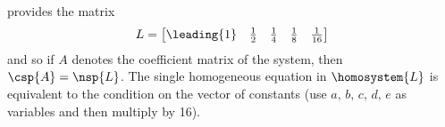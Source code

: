 provides the matrix
%
\begin{equation*}
L=
\begin{bmatrix}
\leading{1} & \frac{1}{2} & \frac{1}{4} & \frac{1}{8} & \frac{1}{16}
\end{bmatrix}
\end{equation*}
%
and so if $A$ denotes the coefficient matrix of the system, then $\csp{A}=\nsp{L}$.  The single homogeneous equation in $\homosystem{L}$ is equivalent to the condition on the vector of constants (use $a,\,b,\,c,\,d,\,e$ as variables and then multiply by 16).